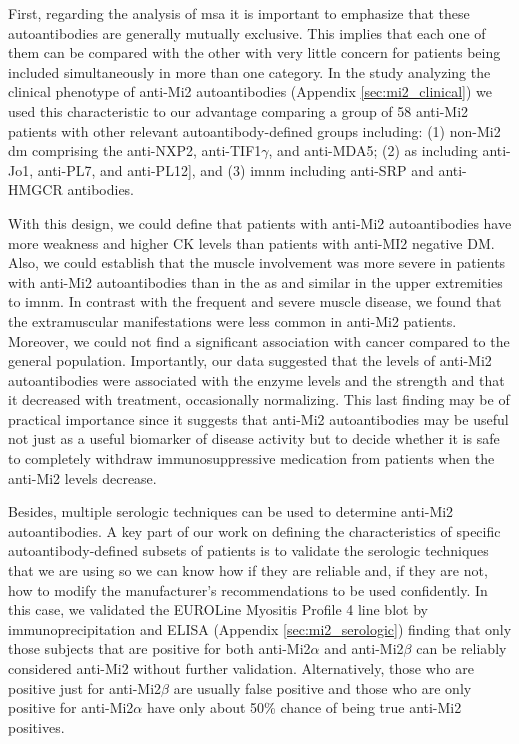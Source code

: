 First, regarding the analysis of \gls{msa} it is important to emphasize that these autoantibodies are generally mutually exclusive. This implies that each one of them can be compared with the other with very little concern for patients being included simultaneously in more than one category. In the study analyzing the clinical phenotype of anti-Mi2 autoantibodies (Appendix \autoref{sec:mi2_clinical}) we used this characteristic to our advantage comparing a group of 58 anti-Mi2 patients with other relevant autoantibody-defined groups including: (1) non-Mi2 \gls{dm} comprising the anti-NXP2, anti-TIF1$\gamma$, and anti-MDA5; (2) \gls{as} including anti-Jo1, anti-PL7, and anti-PL12], and (3) \gls{imnm} including anti-SRP and anti-HMGCR antibodies.

With this design, we could define that patients with anti-Mi2 autoantibodies have more weakness and higher CK levels than patients with anti-MI2 negative DM. Also, we could establish that the muscle involvement was more severe in patients with anti-Mi2 autoantibodies than in the \gls{as} and similar in the upper extremities to \gls{imnm}. In contrast with the frequent and severe muscle disease, we found that the extramuscular manifestations were less common in anti-Mi2 patients. Moreover, we could not find a significant association with cancer compared to the general population. Importantly, our data suggested that the levels of anti-Mi2 autoantibodies were associated with the enzyme levels and the strength and that it decreased with treatment, occasionally normalizing. This last finding may be of practical importance since it suggests that anti-Mi2 autoantibodies may be useful not just as a useful biomarker of disease activity but to decide whether it is safe to completely withdraw immunosuppressive medication from patients when the anti-Mi2 levels decrease.

Besides, multiple serologic techniques can be used to determine anti-Mi2 autoantibodies. A key part of our work on defining the characteristics of specific autoantibody-defined subsets of patients is to validate the serologic techniques that we are using so we can know how if they are reliable and, if they are not, how to modify the manufacturer's recommendations to be used confidently. In this case, we validated the EUROLine Myositis Profile 4 line blot by immunoprecipitation and ELISA (Appendix \autoref{sec:mi2_serologic}) finding that only those subjects that are positive for both anti-Mi2$\alpha$ and anti-Mi2$\beta$ can be reliably considered anti-Mi2 without further validation. Alternatively, those who are positive just for anti-Mi2$\beta$ are usually false positive and those who are only positive for anti-Mi2$\alpha$ have only about 50\% chance of being true anti-Mi2 positives.

